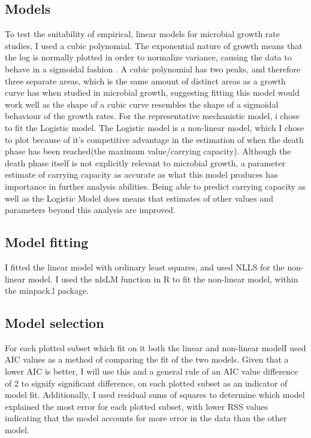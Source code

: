 \documentclass[11pt, titlepage]{article}
\begin{document}
    \subsection*{Models}
    To test the suitability of empirical, linear models for microbial growth rate studies, I used a cubic polynomial. The exponential nature of growth means that the log is normally plotted in order to normalize variance, causing the data to behave in a sigmoidal fashion \cite{zwietering1990modeling}. A cubic polynomial has two peaks, and therefore three separate areas, which is the same amount of distinct areas as a growth curve has when studied in microbial growth, suggesting fitting this model would work well as the shape of a cubic curve resembles the shape of a sigmoidal behaviour of the growth rates. For the representative mechanistic model, i chose to fit the Logistic model. The Logistic model is a non-linear model, which I chose to plot because of it's competitive advantage in the estimation of when the death phase has been reached(the maximum value/carrying capacity). Although the death phase itself is not explicitly relevant to microbial growth, a parameter estimate of carrying capacity as accurate as what this model produces has importance in further analysis abilities. Being able to predict carrying capacity as well as the Logistic Model does means that estimates of other values and parameters beyond this analysis are improved. 

    \subsection*{Model fitting}
    I fitted the linear model with ordinary least squares, and used NLLS for the non-linear model. I used the nlsLM function in R to fit the non-linear model, within the minpack.l package. 


    \subsection*{Model selection}
    For each plotted subset which fit on it both the linear and non-linear modelI used AIC values as a method of comparing the fit of the two models. Given that a lower AIC is better, I will use this and a general rule of an AIC value difference of 2 to signify significant difference, on each plotted subset as an indicator of model fit. Additionally, I used residual sums of squares to determine which model explained the most error for each plotted subset, with lower RSS values indicating that the model accounts for more error in the data than the other model.
    
\end{document}
